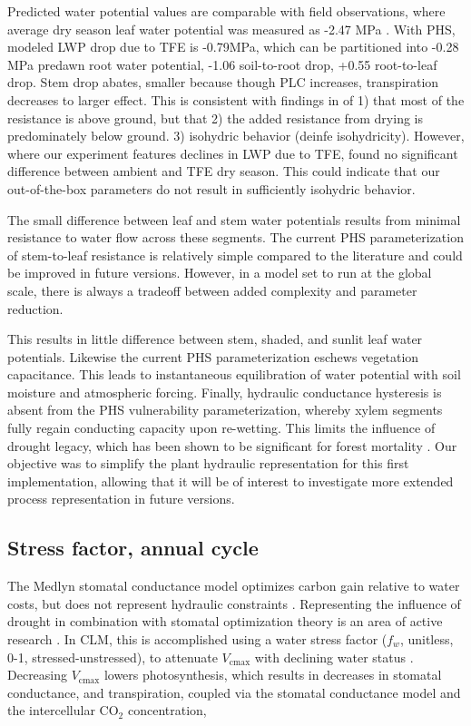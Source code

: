 \documentclass[draft,linenumbers]{agujournal}
\begin{document}
Predicted water potential values are comparable with field observations, where average dry season leaf water potential was measured as -2.47 MPa \citep{fisher2006}.
With PHS, modeled LWP drop due to TFE is -0.79MPa, which can be partitioned into -0.28 MPa predawn root water potential, -1.06 soil-to-root drop, +0.55 root-to-leaf drop.
Stem drop abates, smaller because though PLC increases, transpiration decreases to larger effect.
This is consistent with findings in \cite{fisher2006} of 
1) that most of the resistance is above ground, but that
2) the added resistance from drying is predominately below ground.
3) isohydric behavior (deinfe isohydricity).
However, where our experiment features declines in LWP due to TFE, \cite{fisher2006} found no significant difference between ambient and TFE dry season.
This could indicate that our out-of-the-box parameters do not result in sufficiently isohydric behavior.

The small difference between leaf and stem water potentials results from minimal resistance to water flow across these segments. 
The current PHS parameterization of stem-to-leaf resistance is relatively simple compared to the literature \citep{franks2007} and could be improved in future versions. 
However, in a model set to run at the global scale, there is always a tradeoff between added complexity and parameter reduction.

This results in little difference between stem, shaded, and sunlit leaf water potentials.
Likewise the current PHS parameterization eschews vegetation capacitance. \citep{meinzer2004}
This leads to instantaneous equilibration of water potential with soil moisture and atmospheric forcing.
Finally, hydraulic conductance hysteresis is absent from the PHS vulnerability parameterization, 
whereby xylem segments fully regain conducting capacity upon re-wetting.
This limits the influence of drought legacy, which has been shown to be significant for forest mortality \citep{anderegg2013}.
Our objective was to simplify the plant hydraulic representation for this first implementation, 
allowing that it will be of interest to investigate more extended process representation in future versions.

\subsection{Stress factor, annual cycle}

The Medlyn stomatal conductance model optimizes carbon gain relative to water costs, but does not represent hydraulic constraints \citep{medlyn2011}.
Representing the influence of drought in combination with stomatal optimization theory is an area of active research \citep{zhou2013,novick2016a}.
In CLM, this is accomplished using a water stress factor ($f_w$, unitless, 0-1, stressed-unstressed), to attenuate $V_{\text{cmax}}$ with declining water status \citep{oleson2013}. 
Decreasing $V_{\text{cmax}}$ lowers photosynthesis, which results in decreases in stomatal conductance, and transpiration, 
coupled via the stomatal conductance model and the intercellular CO$_2$ concentration, 
\end{document}
